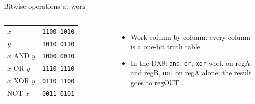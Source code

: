 \documentclass[10pt]{wosm-slides}
\newcommand*\byte[2]{\texttt{#1\,#2}}
\begin{document}
\begin{frame}{Bitwise operations at work}
  \begin{columns}[c, totalwidth=\textwidth]
      \centering
      \begin{tabular}{@{}lc@{}}
        $x$ & \byte{1100}{1010} \\
        $y$ & \byte{1010}{0110} \\
        \midrule
        $x$ AND $y$ & \byte{1000}{0010} \\
        $x$ OR $y$  & \byte{1110}{1110} \\
        $x$ XOR $y$ & \byte{0110}{1100} \\
        NOT $x$     & \byte{0011}{0101} \\
      \end{tabular}
      \begin{itemize}
        \item Work column by column: every column is a one-bit truth table.
        \item In the DX8: \texttt{and}, \texttt{or}, \texttt{xor} work on regA and
          regB, \texttt{not} on regA alone; the result goes to regOUT
          .
      \end{itemize}
  \end{columns}
\end{frame}
\end{document}
